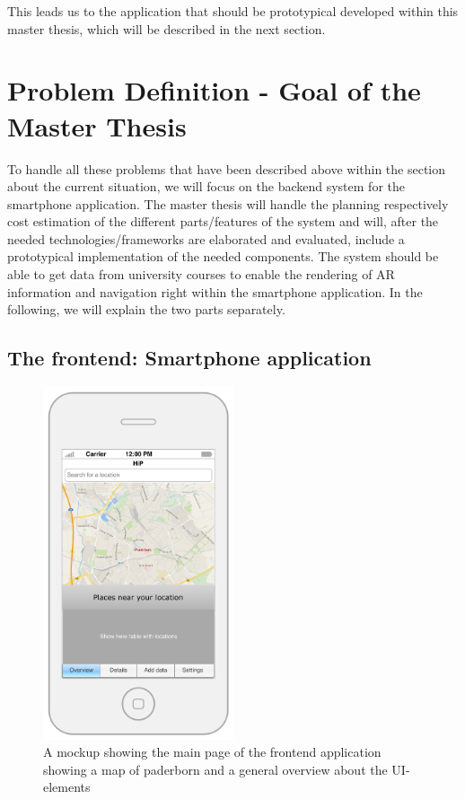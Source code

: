 \documentclass[a4page]{article}
\begin{document}
This leads us to the application that should be prototypical developed within this master thesis, which will be described in the next section. 
  
\section{Problem Definition - Goal of the Master Thesis} 
\label{ProblemDef}
To handle all these problems that have been described above within the section about the current situation, we will focus on the backend system for the smartphone application. The master thesis will handle the planning respectively cost estimation of the different parts/features of the system and will, after the needed technologies/frameworks are elaborated and evaluated, include a prototypical implementation of the needed components. The system should be able to get data from university courses to enable the rendering of \ac{AR} information and navigation right within the smartphone application. In the following, we will explain the two parts separately.

\subsection{The frontend: Smartphone application} 
\begin{figure}[th]
\centerline{\includegraphics[width=0.5\textwidth]{gfx/mockup_app_1}}
\caption{A mockup showing the main page of the frontend application showing a map of paderborn and a general overview about the UI-elements}
\label{app1}
\end{figure}
\end{document}
